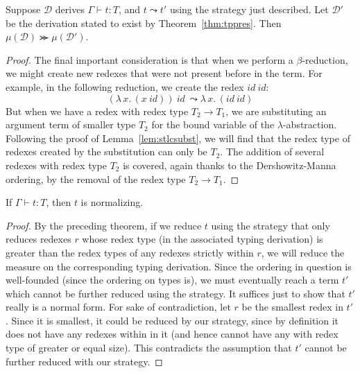 \documentclass{article}
\begin{document}
\vspace{.25cm}
\begin{theorem}
\label{thm:meas}
  Suppose $\mathcal{D}$ derives $\Gamma \vdash t : T$, and $t \leadsto t'$ using
  the strategy just described.
  Let $\mathcal{D}'$ be the derivation stated to exist by Theorem~\ref{thm:tppres}.
  Then $\mu(\mathcal{D}) \ggcurly \mu(\mathcal{D}')$.
\end{theorem}

\begin{proof}
  \noindent The final important consideration is that when we perform a $\beta$-reduction,
  we might create new redexes that were not present before in the term.  For example,
  in the following reduction, we create the redex $\textit{id}\ \textit{id}$:
  \[
  (\lambda\, x.\,(x\ \textit{id}))\ \textit{id} \ \leadsto
  \lambda\, x.\,(\textit{id} \ \textit{id})
  \]
  \noindent But when we have a redex with redex type $T_2\to T_1$, we are substituting
  an argument term of smaller type $T_2$ for the bound variable of the $\lambda$-abstraction.
  Following the proof of Lemma~\ref{lem:stlcsubst}, we will find that the redex type of
  redexes created by the substitution can only be $T_2$.  The addition of several redexes
  with redex type $T_2$ is covered, again thanks to the Dershowitz-Manna ordering, by the
  removal of the redex type $T_2 \to T_1$.
\end{proof}

\begin{corollary}
  If $\Gamma \vdash t : T$, then $t$ is normalizing.
\end{corollary}
\begin{proof} By the preceding theorem, if we reduce $t$ using the strategy
  that only reduces redexes $r$ whose redex type (in the associated typing derivation) is greater than the
  redex types of any redexes strictly within $r$, we will reduce the
  measure on the corresponding typing derivation.  Since the ordering
  in question is well-founded (since the ordering on types is), we
  must eventually reach a term $t'$ which cannot be further reduced
  using the strategy.  It suffices just to show that $t'$ really is a
  normal form.  For sake of contradiction, let $r$ be the smallest
  redex in $t'$.  Since it is smallest, it could be reduced by our
  strategy, since by definition it does not have any redexes within in
  it (and hence cannot have any with redex type of greater or equal
  size).  This contradicts the assumption that $t'$ cannot be further
  reduced with our strategy.
\end{proof}
\end{document}
